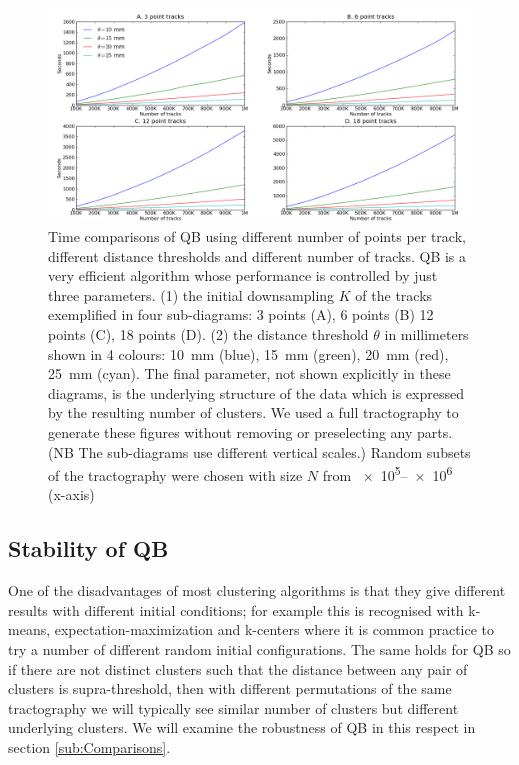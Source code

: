 \documentclass[preprint,authoryear,a4paper,10pt,onecolumn]{elsarticle}
\begin{document}
\begin{figure}
\noindent \begin{centering}
\includegraphics[scale=0.33]{2x2+leg-box}
\par\end{centering}
\caption{Time comparisons of QB using different number of points per
  track, different distance thresholds and different number of
  tracks. QB is a very efficient algorithm whose performance is
  controlled by just three parameters. (1) the initial downsampling $K$
  of the tracks exemplified in four sub-diagrams: 3 points (A), 6 points
  (B) 12 points (C), 18 points (D). (2) the distance threshold $\theta$
  in millimeters shown in 4 colours: 10~mm (blue), 15~mm (green), 20~mm
  (red), 25~mm (cyan). The final parameter, not shown explicitly in
  these diagrams, is the underlying structure of the data which is
  expressed by the resulting number of clusters.  We used a full
  tractography to generate these figures without removing or
  preselecting any parts. (NB The sub-diagrams use
  different vertical scales.) Random subsets of the tractography were
  chosen with size $N$ from \numrange{e5}{e6} (x-axis)\label{Flo:Speed1}}
\end{figure}

\subsection{Stability of QB\label{sub:Comparisons}}

One of the disadvantages of most clustering algorithms is that they give
different results with different initial conditions; for example this is
recognised with k-means, expectation-maximization
\citep{dempster1977maximum} and k-centers \citep{gonzalez1985clustering}
where it is common practice to try a number of different random initial
configurations. The same holds for QB so if there are not distinct
clusters such that the distance between any pair of clusters is
supra-threshold, then with different permutations of the same
tractography we will typically see similar number of clusters but
different underlying clusters. We will examine the robustness of QB in
this respect in section \ref{sub:Comparisons}.
\end{document}
